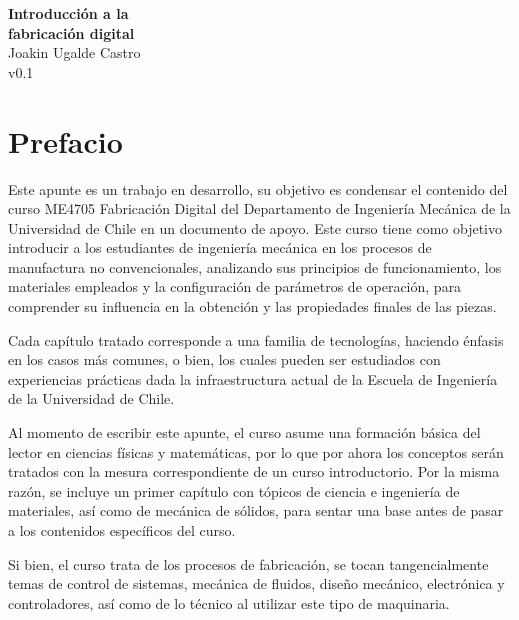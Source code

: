 \documentclass[12pt,letter,oneside]{book}
\numberwithin{equation}{chapter}
\numberwithin{figure}{chapter}
\numberwithin{table}{chapter}
\begin{document}
\begin{titlepage}
    \centering
     \vspace*{\fill}
    {\Huge \textbf{Introducción a la \\[0.5cm] fabricación digital}}\\[0.5cm]
    {\large Joakin Ugalde Castro}\\
    {\large v0.1}\\[4cm]
    \vfill
\end{titlepage}

\tableofcontents

\chapter*{Prefacio}

Este apunte es un trabajo en desarrollo, su objetivo es condensar el contenido del curso ME4705 Fabricación Digital del Departamento de Ingeniería Mecánica de la Universidad de Chile en un documento de apoyo. Este curso tiene como objetivo introducir a los estudiantes de ingeniería mecánica en los procesos de manufactura no convencionales, analizando sus principios de funcionamiento, los materiales empleados y la configuración de parámetros de operación, para comprender su influencia en la obtención y las propiedades finales de las piezas.

Cada capítulo tratado corresponde a una familia de tecnologías, haciendo énfasis en los casos más comunes, o bien, los cuales pueden ser estudiados con experiencias prácticas dada la infraestructura actual de la Escuela de Ingeniería de la Universidad de Chile.

Al momento de escribir este apunte, el curso asume una formación básica del lector en ciencias físicas y matemáticas, por lo que por ahora los conceptos serán tratados con la mesura correspondiente de un curso introductorio. Por la misma razón, se incluye un primer capítulo con tópicos de ciencia e ingeniería de materiales, así como de mecánica de sólidos, para sentar una base antes de pasar a los contenidos específicos del curso.

Si bien, el curso trata de los procesos de fabricación, se tocan tangencialmente temas de control de sistemas, mecánica de fluidos, diseño mecánico, electrónica y controladores, así como de lo técnico al utilizar este tipo de maquinaria.











\backmatter            %


\printbibliography
\end{document}
